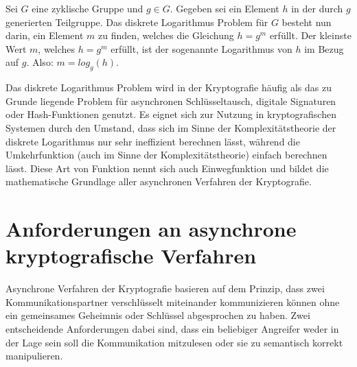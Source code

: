 Sei $ G $ eine zyklische Gruppe und $ g \in G $. Gegeben sei ein Element $h$ in der durch $g$ generierten Teilgruppe.
Das diskrete Logarithmus Problem für $G$ besteht nun darin, ein Element $m$ zu finden, welches die Gleichung $ h = g^m $ erfüllt.
Der kleinste Wert $m$, welches $h = g^m$ erfüllt, ist der sogenannte Logarithmus von $h$ im Bezug auf $g$. Also: $m = log_g(h)$.

Das diskrete Logarithmus Problem wird in der Kryptografie häufig als das zu Grunde liegende Problem für asynchronen Schlüsseltausch, digitale Signaturen oder Hash-Funktionen genutzt. Es eignet sich zur Nutzung in kryptografischen
Systemen durch den Umstand, dass sich im Sinne der Komplexitätstheorie der diskrete Logarithmus nur sehr ineffizient
berechnen lässt, während die Umkehrfunktion (auch im Sinne der Komplexitätstheorie) einfach berechnen lässt.
Diese Art von Funktion nennt sich auch Einwegfunktion und bildet die mathematische Grundlage aller asynchronen 
Verfahren der Kryptografie.	

\section{Anforderungen an asynchrone kryptografische Verfahren}

Asynchrone Verfahren der Kryptografie basieren auf dem Prinzip, dass zwei Kommunikationspartner verschlüsselt miteinander kommunizieren können ohne ein gemeinsames Geheimnis oder Schlüssel abgesprochen zu haben. Zwei entscheidende Anforderungen dabei sind, dass ein beliebiger Angreifer weder in der Lage sein soll die Kommunikation mitzulesen oder sie zu semantisch korrekt manipulieren.


